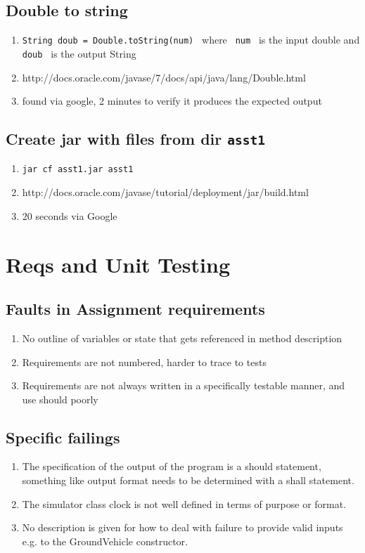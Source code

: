 \documentclass{article}
\begin{document}
\subsection{Double to string}
\begin{enumerate}
	\item \verb|String doub = Double.toString(num) | where \verb| num | is the input double and \verb| doub | is the output String
	\item http://docs.oracle.com/javase/7/docs/api/java/lang/Double.html
	\item found via google, 2 minutes to verify it produces the expected output
\end{enumerate}

\subsection{Create jar with files from dir \tt asst1}
\begin{enumerate}
	\item \verb|jar cf asst1.jar asst1|
	\item http://docs.oracle.com/javase/tutorial/deployment/jar/build.html
	\item 20 seconds via Google
\end{enumerate}

\setcounter{section}{3}
\section{Reqs and Unit Testing}
\subsection{Faults in Assignment requirements}
\begin{enumerate}
	\item No outline of variables or state that gets referenced in method description
	\item Requirements are not numbered, harder to trace to tests
	\item Requirements are not always written in a specifically testable manner, and use should poorly
\end{enumerate}
\subsection{Specific failings}
\begin{enumerate}
	\item The specification of the output of the program is a should statement, something like output format needs to be determined with a shall statement.
	\item The simulator class clock is not well defined in terms of purpose or format.
	\item No description is given for how to deal with failure to provide valid inputs e.g. to the GroundVehicle constructor.
\end{enumerate}
\end{document}
